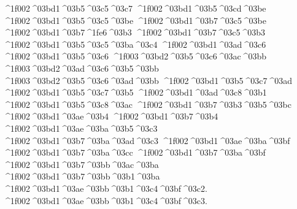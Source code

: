 { ^^^^1f002^^^^03bd1^^^^03b5^^^^03c5^^^^03c7
 ^^^^1f002^^^^03bd1^^^^03b5^^^^03cd^^^^03be  		%
 ^^^^1f002^^^^03bd1^^^^03b5^^^^03c5^^^^03be
 ^^^^1f002^^^^03bd1^^^^03b7^^^^03c5^^^^03be  		%
 ^^^^1f002^^^^03bd1^^^^03b7^^^^1fe6^^^^03b3		%
 ^^^^1f002^^^^03bd1^^^^03b7^^^^03c5^^^^03b3
 ^^^^1f002^^^^03bd1^^^^03b5^^^^03c5^^^^03ba^^^^03c4		%
^^^^1f002^^^^03bd1^^^^03ad^^^^03c6    		%
^^^^1f002^^^^03bd1^^^^03b5^^^^03c6
	^^^^1f003^^^^03bd2^^^^03b5^^^^03c6^^^^03ac^^^^03bb  	%
	^^^^1f003^^^^03bd2^^^^03ad^^^^03c6^^^^03b5^^^^03bb  	%
	^^^^1f003^^^^03bd2^^^^03b5^^^^03c6^^^^03ad^^^^03bb
^^^^1f002^^^^03bd1^^^^03b5^^^^03c7^^^^03ad   		%
^^^^1f002^^^^03bd1^^^^03b5^^^^03c7^^^^03b5
^^^^1f002^^^^03bd1^^^^03ad^^^^03c8^^^^03b1   		%
^^^^1f002^^^^03bd1^^^^03b5^^^^03c8^^^^03ac
^^^^1f002^^^^03bd1^^^^03b7^^^^03b3^^^^03b5^^^^03bc   		%
^^^^1f002^^^^03bd1^^^^03ae^^^^03b4    		%
^^^^1f002^^^^03bd1^^^^03b7^^^^03b4
^^^^1f002^^^^03bd1^^^^03ae^^^^03ba^^^^03b5^^^^03c3    		%
^^^^1f002^^^^03bd1^^^^03b7^^^^03ba^^^^03ad^^^^03c3
^^^^1f002^^^^03bd1^^^^03ae^^^^03ba^^^^03bf		%
^^^^1f002^^^^03bd1^^^^03b7^^^^03ba^^^^03cc 
^^^^1f002^^^^03bd1^^^^03b7^^^^03ba^^^^03bf
^^^^1f002^^^^03bd1^^^^03b7^^^^03bb^^^^03ac^^^^03ba    		%
^^^^1f002^^^^03bd1^^^^03b7^^^^03bb^^^^03b1^^^^03ba
^^^^1f002^^^^03bd1^^^^03ae^^^^03bb^^^^03b1^^^^03c4^^^^03bf^^^^03c2. 		%
^^^^1f002^^^^03bd1^^^^03ae^^^^03bb^^^^03b1^^^^03c4^^^^03bf^^^^03c3.
}
